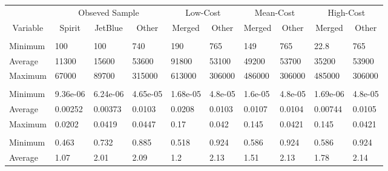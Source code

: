 
\begin{tabular}[t]{llllllllll}
\toprule
\multicolumn{1}{c}{ } & \multicolumn{3}{c}{Obseved Sample} & \multicolumn{2}{c}{Low-Cost} & \multicolumn{2}{c}{Mean-Cost} & \multicolumn{2}{c}{High-Cost} \\
\cmidrule(l{3pt}r{3pt}){2-4} \cmidrule(l{3pt}r{3pt}){5-6} \cmidrule(l{3pt}r{3pt}){7-8} \cmidrule(l{3pt}r{3pt}){9-10}
\multicolumn{1}{c}{Variable} & \multicolumn{1}{c}{Spirit} & \multicolumn{1}{c}{JetBlue} & \multicolumn{1}{c}{Other} & \multicolumn{1}{c}{Merged} & \multicolumn{1}{c}{Other} & \multicolumn{1}{c}{Merged} & \multicolumn{1}{c}{Other} & \multicolumn{1}{c}{Merged} & \multicolumn{1}{c}{Other} \\
\cmidrule(l{3pt}r{3pt}){1-1} \cmidrule(l{3pt}r{3pt}){2-2} \cmidrule(l{3pt}r{3pt}){3-3} \cmidrule(l{3pt}r{3pt}){4-4} \cmidrule(l{3pt}r{3pt}){5-5} \cmidrule(l{3pt}r{3pt}){6-6} \cmidrule(l{3pt}r{3pt}){7-7} \cmidrule(l{3pt}r{3pt}){8-8} \cmidrule(l{3pt}r{3pt}){9-9} \cmidrule(l{3pt}r{3pt}){10-10}
\addlinespace[0.3em]
\multicolumn{10}{l}{\textbf{Passengers}}\\
\hspace{1em}Minimum & 100 & 100 & 740 & 190 & 765 & 149 & 765 & 22.8 & 765\\
\hspace{1em}Average & 11300 & 15600 & 53600 & 91800 & 53100 & 49200 & 53700 & 35200 & 53900\\
\hspace{1em}Maximum & 67000 & 89700 & 315000 & 613000 & 306000 & 486000 & 306000 & 485000 & 306000\\
\addlinespace[0.3em]
\multicolumn{10}{l}{\textbf{Market Share}}\\
\hspace{1em}Minimum & 9.36e-06 & 6.24e-06 & 4.65e-05 & 1.68e-05 & 4.8e-05 & 1.6e-05 & 4.8e-05 & 1.69e-06 & 4.8e-05\\
\hspace{1em}Average & 0.00252 & 0.00373 & 0.0103 & 0.0208 & 0.0103 & 0.0107 & 0.0104 & 0.00744 & 0.0105\\
\hspace{1em}Maximum & 0.0202 & 0.0419 & 0.0447 & 0.17 & 0.042 & 0.145 & 0.0421 & 0.145 & 0.0421\\
\addlinespace[0.3em]
\multicolumn{10}{l}{\textbf{Prices}}\\
\hspace{1em}Minimum & 0.463 & 0.732 & 0.885 & 0.518 & 0.924 & 0.586 & 0.924 & 0.586 & 0.924\\
\hspace{1em}Average & 1.07 & 2.01 & 2.09 & 1.2 & 2.13 & 1.51 & 2.13 & 1.78 & 2.14\\

\end{tabular}
